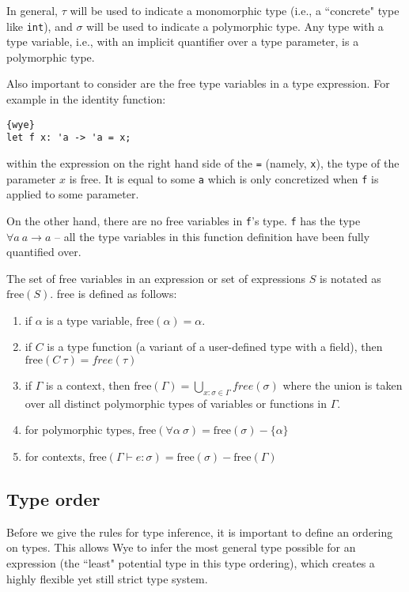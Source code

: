 \documentclass[a4paper, 12pt]{article}
\newcommand{\free}{\text{free}}
\begin{document}
In general, $\tau$ will be used to indicate a monomorphic type (i.e., a ``concrete" type like \texttt{int}), and $\sigma$ will be used to indicate a polymorphic type. Any type with a type variable, i.e., with an implicit quantifier over a type parameter, is a polymorphic type.

Also important to consider are the free type variables in a type expression. For example in the identity function:
\begin{lstlisting}{wye}
let f x: 'a -> 'a = x;
\end{lstlisting}
within the expression on the right hand side of the \texttt{=} (namely, \texttt{x}), the type of the parameter $x$ is free. It is equal to some \texttt{a} which is only concretized when \texttt{f} is applied to some parameter.

On the other hand, there are no free variables in \texttt{f}'s type. \texttt{f} has the type $\forall a\: a\to a$ -- all the type variables in this function definition have been fully quantified over.

The set of free variables in an expression or set of expressions $S$ is notated as $\free(S)$. free is defined as follows:
\begin{enumerate}
\item if $\alpha$ is a type variable, $\free(\alpha) = \alpha$.
\item if $C$ is a type function (a variant of a user-defined type with a field), then $\free(C\: \tau) = free(\tau)$
\item if $\Gamma$ is a context, then $\free(\Gamma) = \bigcup_{x : \sigma\in\Gamma }free(\sigma)$ where the union is taken over all distinct polymorphic types of variables or functions in $\Gamma$.
\item for polymorphic types, $\free(\forall \alpha \: \sigma) = \free(\sigma) - \{\alpha\}$
\item for contexts, $\free(\Gamma\vdash e: \sigma) = \free(\sigma) - \free(\Gamma)$
\end{enumerate}

\subsection{Type order}

Before we give the rules for type inference, it is important to define an ordering on types. This allows Wye to infer the most general type possible for an expression (the ``least" potential type in this type ordering), which creates a highly flexible yet still strict type system.
\end{document}
